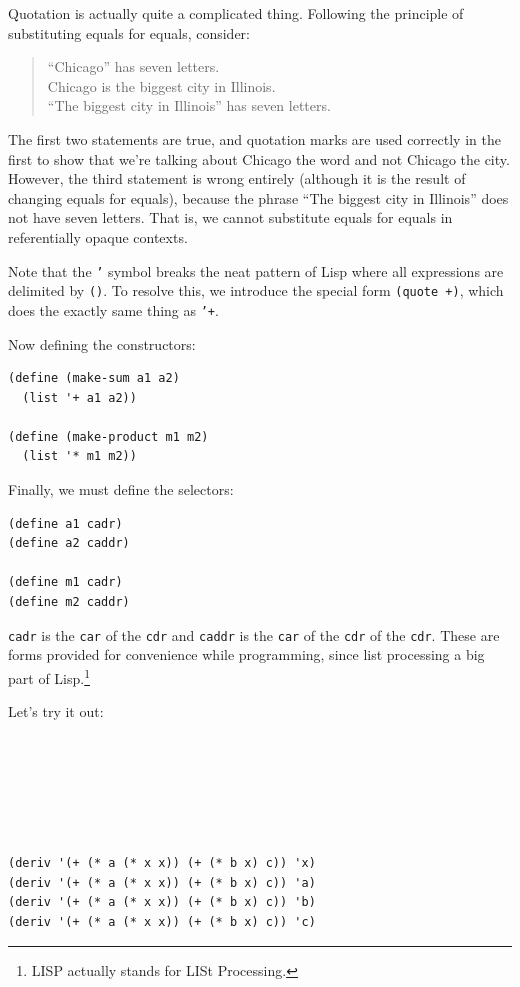 \documentclass[9pt]{report}
\begin{document}
Quotation is actually quite a complicated thing. Following the
principle of substituting equals for equals, consider:

\begin{verse}
``Chicago'' has seven letters.\\
Chicago is the biggest city in Illinois.\\
``The biggest city in Illinois'' has seven letters.\\
\end{verse}

The first two statements are true, and quotation marks are used
correctly in the first to show that we're talking about Chicago
the word and not Chicago the city. However, the third statement is
wrong entirely (although it is the result of changing equals for
equals), because the phrase ``The biggest city in Illinois'' does
not have seven letters.
That is, we cannot substitute equals for equals in referentially
opaque contexts.

Note that the \texttt{'} symbol breaks the neat pattern of Lisp where all
expressions are delimited by \texttt{()}. To resolve this, we introduce
the special form \texttt{(quote +)}, which does the exactly same thing as
\texttt{'+}.

Now defining the constructors:

\begin{verbatim}
(define (make-sum a1 a2)
  (list '+ a1 a2))

(define (make-product m1 m2)
  (list '* m1 m2))
\end{verbatim}


Finally, we must define the selectors:

\begin{verbatim}
(define a1 cadr)
(define a2 caddr)

(define m1 cadr)
(define m2 caddr)
\end{verbatim}


\texttt{cadr} is the \texttt{car} of the \texttt{cdr} and \texttt{caddr} is the \texttt{car} of the
\texttt{cdr} of the \texttt{cdr}. These are forms provided for convenience while
programming, since list processing a big part of Lisp.\footnote{LISP actually stands for LISt Processing.}

Let's try it out:

\begin{verbatim}






(deriv '(+ (* a (* x x)) (+ (* b x) c)) 'x)
(deriv '(+ (* a (* x x)) (+ (* b x) c)) 'a)
(deriv '(+ (* a (* x x)) (+ (* b x) c)) 'b)
(deriv '(+ (* a (* x x)) (+ (* b x) c)) 'c)
\end{verbatim}
\end{document}
